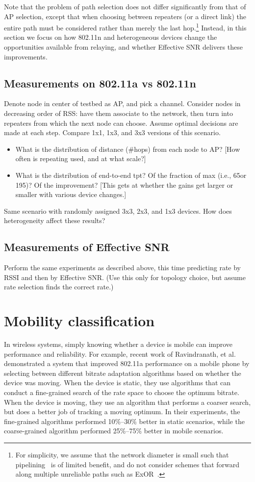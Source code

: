 Note that the problem of path selection does not differ significantly from that of AP selection, except that when choosing between repeaters (or a direct link) the entire path must be considered rather than merely the last hop.\footnote{For simplicity, we assume that the network diameter is small such that pipelining~\cite{Rodrig_thesis} is of limited benefit, and do not consider schemes that forward along multiple unreliable paths such as ExOR~\cite{Biswas_ExOR}.} Instead, in this section we focus on how 802.11n and heterogeneous devices change the opportunities available from relaying, and whether Effective SNR delivers these improvements.

\subsection{Measurements on 802.11a vs 802.11n}
Denote node in center of testbed as AP, and pick a channel. Consider nodes in decreasing order of RSS: have them associate to the network, then turn into repeaters from which the next node can choose. Assume optimal decisions are made at each step. Compare 1x1, 1x3, and 3x3 versions of this scenario.
\begin{itemize}
\item What is the distribution of distance (\#hops) from each node to AP? [How often is repeating used, and at what scale?]
\item What is the distribution of end-to-end tpt? Of the fraction of max (i.e., 65\Mbps or 195\Mbps)? Of the improvement? [This gets at whether the gains get larger or smaller with various device changes.]
\end{itemize}
Same scenario with randomly assigned 3x3, 2x3, and 1x3 devices. How does heterogeneity affect these results?

\subsection{Measurements of Effective SNR}
Perform the same experiments as described above, this time predicting rate by RSSI and then by Effective SNR. (Use this only for topology choice, but assume rate selection finds the correct rate.)

\section{Mobility classification}\label{sec:esnr_mobility}
In wireless systems, simply knowing whether a device is mobile can improve performance and reliability. For example, recent work of Ravindranath, et al.\ \cite{Ravindranath_SensorHints} demonstrated a system that improved 802.11a performance on a mobile phone by selecting between different bitrate adaptation algorithms based on whether the device was moving. When the device is static, they use algorithms that can conduct a fine-grained search of the rate space to choose the optimum bitrate. When the device is moving, they use an algorithm that performs a coarser search, but does a better job of tracking a moving optimum. In their experiments, the fine-grained algorithms performed 10\%--30\% better in static scenarios, while the coarse-grained algorithm performed 25\%--75\% better in mobile scenarios.

